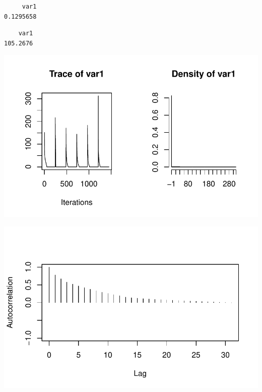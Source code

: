 \documentclass[
  letterpaper,
  DIV=11,
  numbers=noendperiod]{scrartcl}
\begin{document}
\begin{verbatim}
     var1 
0.1295658 
\end{verbatim}

\begin{verbatim}
    var1 
105.2676 
\end{verbatim}

\includegraphics{Main_files/figure-pdf/unnamed-chunk-13-3.pdf}

\includegraphics{Main_files/figure-pdf/unnamed-chunk-13-4.pdf}
\end{document}
